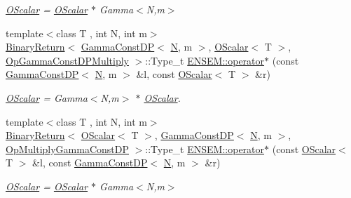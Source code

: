 \begin{DoxyCompactItemize}
\begin{DoxyCompactList}\small\item\em \mbox{\hyperlink{classENSEM_1_1OScalar}{O\+Scalar}} = \mbox{\hyperlink{classENSEM_1_1OScalar}{O\+Scalar}} $\ast$ Gamma$<$\+N,m$>$ \end{DoxyCompactList}\item 
{\footnotesize template$<$class T , int N, int m$>$ }\\\mbox{\hyperlink{structENSEM_1_1BinaryReturn}{Binary\+Return}}$<$ \mbox{\hyperlink{classENSEM_1_1GammaConstDP}{Gamma\+Const\+DP}}$<$ \mbox{\hyperlink{operator__name__util_8cc_a7722c8ecbb62d99aee7ce68b1752f337}{N}}, m $>$, \mbox{\hyperlink{classENSEM_1_1OScalar}{O\+Scalar}}$<$ T $>$, \mbox{\hyperlink{structENSEM_1_1OpGammaConstDPMultiply}{Op\+Gamma\+Const\+D\+P\+Multiply}} $>$\+::Type\+\_\+t \mbox{\hyperlink{group__obsscalar_gadcaef62da25fe9015ccfbdc330caee50}{E\+N\+S\+E\+M\+::operator$\ast$}} (const \mbox{\hyperlink{classENSEM_1_1GammaConstDP}{Gamma\+Const\+DP}}$<$ \mbox{\hyperlink{operator__name__util_8cc_a7722c8ecbb62d99aee7ce68b1752f337}{N}}, m $>$ \&l, const \mbox{\hyperlink{classENSEM_1_1OScalar}{O\+Scalar}}$<$ T $>$ \&r)
\begin{DoxyCompactList}\small\item\em \mbox{\hyperlink{classENSEM_1_1OScalar}{O\+Scalar}} = Gamma$<$\+N,m$>$ $\ast$ \mbox{\hyperlink{classENSEM_1_1OScalar}{O\+Scalar}}. \end{DoxyCompactList}\item 
{\footnotesize template$<$class T , int N, int m$>$ }\\\mbox{\hyperlink{structENSEM_1_1BinaryReturn}{Binary\+Return}}$<$ \mbox{\hyperlink{classENSEM_1_1OScalar}{O\+Scalar}}$<$ T $>$, \mbox{\hyperlink{classENSEM_1_1GammaConstDP}{Gamma\+Const\+DP}}$<$ \mbox{\hyperlink{operator__name__util_8cc_a7722c8ecbb62d99aee7ce68b1752f337}{N}}, m $>$, \mbox{\hyperlink{structENSEM_1_1OpMultiplyGammaConstDP}{Op\+Multiply\+Gamma\+Const\+DP}} $>$\+::Type\+\_\+t \mbox{\hyperlink{group__obsscalar_ga3a908302b6f4903874da2282ce03fdf7}{E\+N\+S\+E\+M\+::operator$\ast$}} (const \mbox{\hyperlink{classENSEM_1_1OScalar}{O\+Scalar}}$<$ T $>$ \&l, const \mbox{\hyperlink{classENSEM_1_1GammaConstDP}{Gamma\+Const\+DP}}$<$ \mbox{\hyperlink{operator__name__util_8cc_a7722c8ecbb62d99aee7ce68b1752f337}{N}}, m $>$ \&r)
\begin{DoxyCompactList}\small\item\em \mbox{\hyperlink{classENSEM_1_1OScalar}{O\+Scalar}} = \mbox{\hyperlink{classENSEM_1_1OScalar}{O\+Scalar}} $\ast$ Gamma$<$\+N,m$>$ \end{DoxyCompactList}\item 

\end{DoxyCompactItemize}
